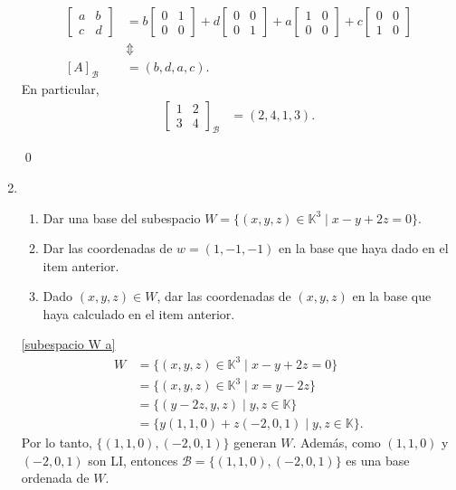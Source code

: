 \begin{enumerate}[topsep=6pt, itemsep=.4cm]
    \rta
    \begin{align*}
        \begin{bmatrix}
            a&b\\c&d 
            \end{bmatrix} &= b\begin{bmatrix}
            0&1\\0&0 
            \end{bmatrix}+d\begin{bmatrix}
            0&0\\0&1 
            \end{bmatrix}+a\begin{bmatrix}
            1&0\\0&0 
            \end{bmatrix}+c\begin{bmatrix}
            0&0\\1&0 
            \end{bmatrix} \\
            &\Updownarrow \\
            [A]_{\mathcal{B}} &= (b,d,a,c). 
    \end{align*}
    En particular,
    \begin{align*}
        \begin{bmatrix}
            1&2\\3&4 
            \end{bmatrix}_{\mathcal{B}} &= (2,4,1,3).
    \end{align*}


    \qed
    
    

\item 
\begin{enumerate}
    \item\label{subespacio W a} Dar una base del subespacio $W=\{(x,y,z)\in\mathbb{K}^3\mid x-y+2z=0\}$. 
    \item\label{subespacio W b} Dar las coordenadas de $w=(1,-1,-1)$ en la base que haya dado en el item anterior.
    \item\label{subespacio W c} Dado $(x,y,z)\in W$, dar las coordenadas de $(x,y,z)$ en la base que haya calculado en el item anterior. 
\end{enumerate}

\rta

\ref{subespacio W a} 
\begin{align*}
    W &= \{(x,y,z)\in\mathbb{K}^3\mid x-y+2z=0\} \\
    &= \{(x,y,z)\in\mathbb{K}^3\mid x=y-2z\} \\
    &= \{(y-2z,y,z)\mid y,z\in\mathbb{K}\} \\
    &= \{y(1,1,0)+z(-2,0,1)\mid y,z\in\mathbb{K}\}.
\end{align*}
Por lo tanto, $\{(1,1,0),(-2,0,1)\}$ generan $W$. Además, como $(1,1,0)$ y $(-2,0,1)$ son LI, entonces $\mathcal{B}=\{(1,1,0),(-2,0,1)\}$ es una base ordenada de $W$. 


\end{enumerate}
